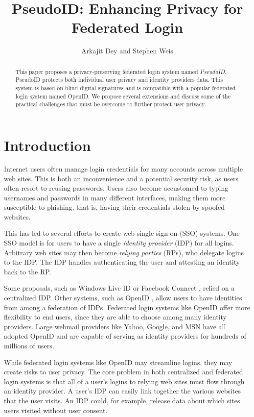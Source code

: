 \documentclass{llncs}
\title{PseudoID: Enhancing Privacy for Federated Login}
\author{Arkajit Dey\inst{1} and Stephen Weis\inst{2}}
\institute{Massachusetts Institute of Technology, Cambridge, MA, USA 02139
\and
Google Inc., Mountain View, CA, USA 94043}
\begin{document}
\maketitle

\begin{abstract}
  This paper proposes a privacy-preserving federated login system
  named \emph{PseudoID}. PseudoID protects both individual user
  privacy and identity providers data. This system is based on blind
  digital signatures and is compatible with a popular federated login
  system named OpenID. We propose several extensions and discuss some
  of the practical challenges that must be overcome to further protect
  user privacy.
\end{abstract}

\section{Introduction}
\label{sec:intro}

Internet users often manage login credentials for many accounts across
multiple web sites. This is both an inconvenience and a potential
security risk, as users often resort to reusing passwords. Users also
become accustomed to typing usernames and passwords in many different
interfaces, making them more susceptible to phishing, that is, having
their credentials stolen by spoofed websites.

This has led to several efforts to create web single sign-on (SSO)
systems. One SSO model is for users to have a single \emph{identity
  provider} (IDP) for all logins. Arbitrary web sites may then become
\emph{relying parties} (RPs), who delegate logins to the IDP. The IDP
handles authenticating the user and attesting an identity back to the
RP.

Some proposals, such as Windows Live ID \cite{MSPass} or Facebook
Connect \cite{FBConnect}, relied on a centralized IDP. Other systems,
such as OpenID \cite{OID}, allow users to have identities from among a
federation of IDPs. Federated login systems like OpenID offer more
flexibility to end users, since they are able to choose among many
identity providers. Large webmail providers like Yahoo, Google, and
MSN have all adopted OpenID \cite{YOP,Sac08,WLOP08} and are capable of
serving as identity providers for hundreds of millions of users.

While federated login systems like OpenID may streamline logins, they
may create risks to user privacy. The core problem in both centralized
and federated login systems is that all of a user's logins to relying
web sites must flow through an identity provider. A user's IDP can
easily link together the various websites that the user visits. An
IDP could, for example, release data about which sites users visited
without user consent.
\end{document}
